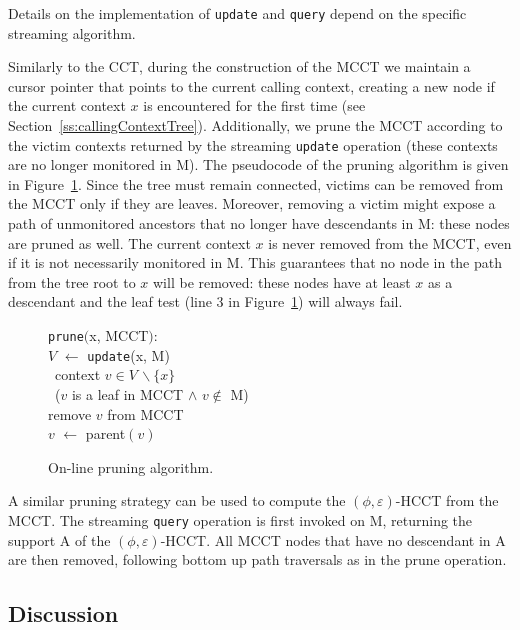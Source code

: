 \documentclass{sigplanconf}
\begin{document}
\noindent Details on the implementation of {\tt update} and {\tt query} depend on the specific streaming algorithm. 

Similarly to the CCT, during the construction of the MCCT we maintain a cursor pointer that points to the current calling context, creating a new node if the current context $x$ is encountered for the first time (see Section~\ref{ss:callingContextTree}). Additionally, we prune the MCCT according to the victim contexts returned by the streaming {\tt update} operation (these contexts are no longer monitored in M). The pseudocode of the pruning algorithm is given in Figure~\ref{fig:update}. Since the tree must remain connected, victims can be removed from the MCCT only if they are leaves. Moreover, removing a victim might expose a path of unmonitored ancestors that no longer have descendants in M: these nodes are pruned as well. The current context $x$ is never removed from the MCCT, even if it is not necessarily monitored in M. This guarantees that no node in the path from the tree root to $x$ will be removed: these nodes have at least $x$ as a descendant and the leaf test (line 3 in Figure~\ref{fig:update}) will always fail.


\begin{figure}[t]
\begin{frameprog}{\columnwidth}{}
{\tt prune}$($x, MCCT$)$: \\
\N \> $V$ $\gets$ {\tt update}(x, M) \\
\N \>  \FOREACH\ context $v\in V\,\backslash \{x\}$ \\
\N \> \> \WHILE\ ($v$ is a leaf in MCCT $\wedge$ $v\not\in$ M) \DO \\
\N \> \> \> remove $v$ from MCCT \\
\N \> \> \> $v$ $\gets$ parent$(v)$ \\
\end{frameprog}
\caption{On-line pruning algorithm.}
\label{fig:update}
\end{figure} 



A similar pruning strategy can be used to compute the $(\phi,\varepsilon)$-HCCT from the MCCT. The streaming {\tt query} operation is first invoked on M, returning the support A of the $(\phi,\varepsilon)$-HCCT. All MCCT nodes that have no descendant in A are then removed, following bottom up path traversals as in the prune operation.

\subsection{Discussion}
\label{ss:discussion}
\end{document}
